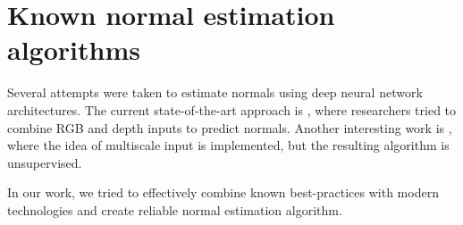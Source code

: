 \section{Known normal estimation algorithms}

Several attempts were taken to estimate normals using deep neural network architectures. The current state-of-the-art approach is \cite{deep_surf}, where researchers tried to combine RGB and depth inputs to predict normals. Another interesting work is \cite{adaptive-neighborhood}, where the idea of multiscale input is implemented, but the resulting algorithm is unsupervised.

In our work, we tried to effectively combine known best-practices with modern technologies and create reliable normal estimation algorithm.